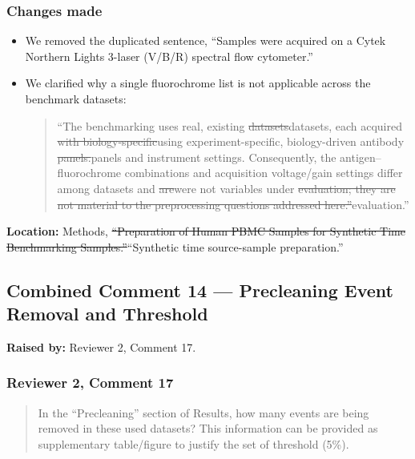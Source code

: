 \documentclass[
  11pt,
  a4paper,
]{article}
\begin{document}
\subsubsection{Changes made}\label{changes-made-12}

\begin{itemize}
\item
  We removed the duplicated sentence, ``Samples were acquired on a Cytek
  Northern Lights 3-laser (V/B/R) spectral flow cytometer.''
\item
  We clarified why a single fluorochrome list is not applicable across
  the benchmark datasets:

  \begin{quote}
  ``The benchmarking uses real, existing
  {\color{revisionred}\sout{datasets}}{\color{revisionblue}datasets,
  each} acquired {\color{revisionred}\sout{with
  biology-specific}}{\color{revisionblue}using experiment-specific,
  biology-driven} antibody
  {\color{revisionred}\sout{panels.}}{\color{revisionblue}panels and
  instrument settings.} Consequently, the antigen--fluorochrome
  combinations {\color{revisionblue}and acquisition voltage/gain
  settings} differ among datasets and
  {\color{revisionred}\sout{are}}{\color{revisionblue}were} not
  variables under {\color{revisionred}\sout{evaluation; they are not
  material to the preprocessing questions addressed
  here.''}}{\color{revisionblue}evaluation.''}
  \end{quote}
\end{itemize}

\textbf{Location:} Methods, {\color{revisionred}\sout{``Preparation of
Human PBMC Samples for Synthetic Time Benchmarking
Samples.''}}{\color{revisionblue}``Synthetic time source-sample
preparation.''}

\subsection{Combined Comment 14 --- Precleaning Event Removal and
Threshold}\label{combined-comment-14--precleaning-event-removal-and-threshold}

\textbf{Raised by:} Reviewer 2, Comment 17.

\subsubsection{Reviewer 2, Comment 17}\label{reviewer-2-comment-17}

\begin{quote}
In the ``Precleaning'' section of Results, how many events are being
removed in these used datasets? This information can be provided as
supplementary table/figure to justify the set of threshold (5\%).
\end{quote}
\end{document}
